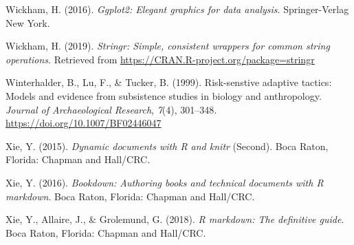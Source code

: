 \documentclass[british,,man,mask,floatsintext]{apa6}
\begin{document}
\leavevmode\hypertarget{ref-R-ggplot2}{}%
Wickham, H. (2016). \emph{Ggplot2: Elegant graphics for data analysis}. Springer-Verlag New York.

\leavevmode\hypertarget{ref-R-stringr}{}%
Wickham, H. (2019). \emph{Stringr: Simple, consistent wrappers for common string operations}. Retrieved from \url{https://CRAN.R-project.org/package=stringr}

\leavevmode\hypertarget{ref-Winterhalder1999}{}%
Winterhalder, B., Lu, F., \& Tucker, B. (1999). Risk-senstive adaptive tactics: Models and evidence from subsistence studies in biology and anthropology. \emph{Journal of Archaeological Research}, \emph{7}(4), 301--348. \url{https://doi.org/10.1007/BF02446047}

\leavevmode\hypertarget{ref-R-knitr}{}%
Xie, Y. (2015). \emph{Dynamic documents with R and knitr} (Second). Boca Raton, Florida: Chapman and Hall/CRC.

\leavevmode\hypertarget{ref-R-bookdown}{}%
Xie, Y. (2016). \emph{Bookdown: Authoring books and technical documents with R markdown}. Boca Raton, Florida: Chapman and Hall/CRC.

\leavevmode\hypertarget{ref-R-rmarkdown}{}%
Xie, Y., Allaire, J., \& Grolemund, G. (2018). \emph{R markdown: The definitive guide}. Boca Raton, Florida: Chapman and Hall/CRC.
\end{document}
